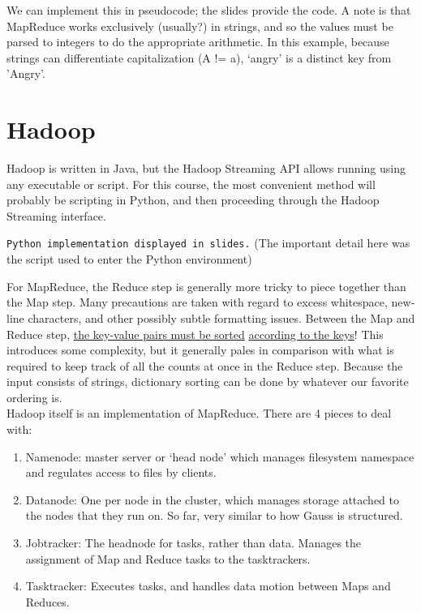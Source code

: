 \documentclass[12pt,letterpaper]{article}
\begin{document}
We can implement this in pseudocode; the slides provide the code. A note is that MapReduce works exclusively (usually?) in strings, and so the values must be parsed to integers to do the appropriate arithmetic. In this example, because strings can differentiate capitalization (A != a), `angry' is a distinct key from 'Angry'. 

\section*{Hadoop}

Hadoop is written in Java, but the Hadoop Streaming API allows running using any executable or script. For this course, the most convenient method will probably be scripting in Python, and then proceeding through the Hadoop Streaming interface.

\texttt{Python implementation displayed in slides.} (The important detail here was the script used to enter the Python environment)

For MapReduce, the Reduce step is generally more tricky to piece together than the Map step. Many precautions are taken with regard to excess whitespace, new-line characters, and other possibly subtle formatting issues. Between the Map and Reduce step, \underline{the key-value pairs must be sorted} \underline{according to the keys}! This introduces some complexity, but it generally pales in comparison with what is required to keep track of all the counts at once in the Reduce step. Because the input consists of strings, dictionary sorting can be done by whatever our favorite ordering is. \\

Hadoop itself is an implementation of MapReduce. There are 4 pieces to deal with:
\begin{enumerate}
\item Namenode: master server or `head node' which manages filesystem namespace and regulates access to files by clients.

\item Datanode: One per node in the cluster, which manages storage attached to the nodes that they run on. So far, very similar to how Gauss is structured.

\item Jobtracker: The headnode for tasks, rather than data. Manages the assignment of Map and Reduce tasks to the tasktrackers.

\item Tasktracker: Executes tasks, and handles data motion between Maps and Reduces.
\end{enumerate}
\end{document}
